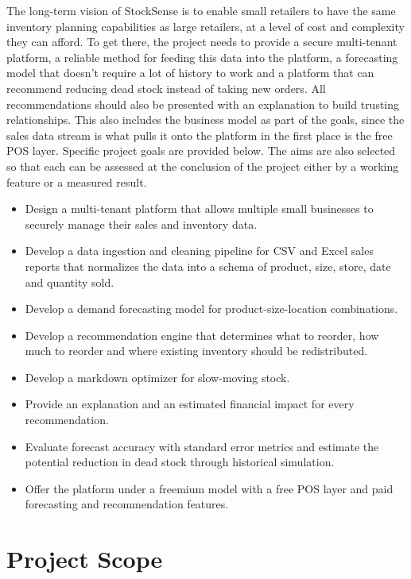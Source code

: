 \documentclass{StockSense}
\begin{document}
The long-term vision of StockSense is to enable small retailers to have the same inventory planning capabilities as large retailers, at a level of cost and complexity they can afford. To get there, the project needs to provide a secure multi-tenant platform, a reliable method for feeding this data into the platform, a forecasting model that doesn't require a lot of history to work and a platform that can recommend reducing dead stock instead of taking new orders. All recommendations should also be presented with an explanation to build trusting relationships. This also includes the business model as part of the goals, since the sales data stream is what pulls it onto the platform in the first place is the free POS layer. Specific project goals are provided below. The aims are also selected so that each can be assessed at the conclusion of the project either by a working feature or a measured result.

\begin{itemize}
    \item Design a multi-tenant platform that allows multiple small businesses to securely manage their sales and inventory data.
    \item Develop a data ingestion and cleaning pipeline for CSV and Excel sales reports that normalizes the data into a schema of product, size, store, date and quantity sold.
    \item Develop a demand forecasting model for product-size-location combinations.
    \item Develop a recommendation engine that determines what to reorder, how much to reorder and where existing inventory should be redistributed.
    \item Develop a markdown optimizer for slow-moving stock.
    \item Provide an explanation and an estimated financial impact for every recommendation.
    \item Evaluate forecast accuracy with standard error metrics and estimate the potential reduction in dead stock through historical simulation.
    \item Offer the platform under a freemium model with a free POS layer and paid forecasting and recommendation features.
\end{itemize}

\section{Project Scope}
\end{document}
